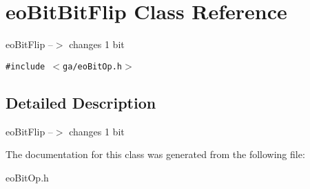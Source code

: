 \section{eo\-Bit\-Bit\-Flip Class Reference}
\label{classeo_bit_bit_flip}
eo\-Bit\-Flip --$>$ changes 1 bit  


{\tt \#include $<$ga/eo\-Bit\-Op.h$>$}



\subsection{Detailed Description}
eo\-Bit\-Flip --$>$ changes 1 bit 



The documentation for this class was generated from the following file:\begin{CompactItemize}
\item 
eo\-Bit\-Op.h\end{CompactItemize}
